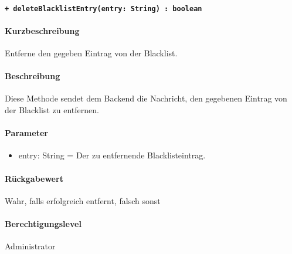 \paragraph{\texttt{+ deleteBlacklistEntry(entry: String) : boolean}}%
\paragraph*{Kurzbeschreibung}
Entferne den gegeben Eintrag von der Blacklist.
\paragraph*{Beschreibung}
Diese Methode sendet dem Backend die Nachricht, den gegebenen Eintrag von der Blacklist zu entfernen.
\paragraph*{Parameter}
\begin{itemize}
    \item entry: String = Der zu entfernende Blacklisteintrag.
\end{itemize}
\paragraph*{Rückgabewert}
Wahr, falls erfolgreich entfernt, falsch sonst
\paragraph*{Berechtigungslevel}
Administrator